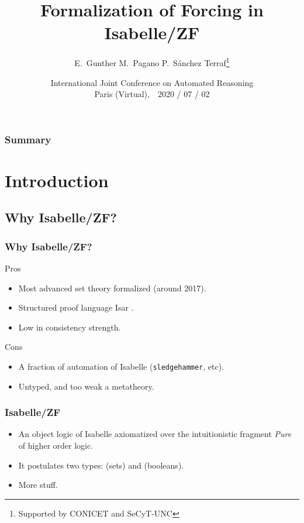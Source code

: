 \documentclass[english]{beamer}
\title[Forcing in Isabelle/ZF]{Formalization of Forcing in Isabelle/ZF}
\author[E.~Gunther, M.~Pagano, PST]{E.~Gunther \qquad M.~Pagano \qquad P.~Sánchez Terraf\thanks{Supported by
    CONICET and SeCyT-UNC} 
}
\institute[UNC]{CIEM-FaMAF --- Universidad Nacional de Córdoba}
\date[IJCAR 2020]{International Joint Conference on Automated
  Reasoning\\ Paris (Virtual),\ \  2020 / 07 / 02}
\begin{document}

\begin{frame}[plain]
  \titlepage
  \begin{center}
    \insertlogo
  \end{center}
\end{frame}
%
\begin{frame}
  \frametitle{Summary}
  \tableofcontents
  \transwipe
\end{frame}
%
\section{Introduction}

\subsection{Why Isabelle/ZF?}

\begin{frame}
  \frametitle{Why Isabelle/ZF?}
  \begin{block}{Pros}
    \begin{itemize}
    \item Most advanced set theory formalized (around 2017).
    \item Structured proof language Isar
      \citep{DBLP:conf/tphol/Wenzel99}.
    \item Low in consistency strength.
    \end{itemize}
  \end{block}
  \pause
  \begin{block}{Cons}
    \begin{itemize}
    \item A fraction of automation of Isabelle (\texttt{sledgehammer},
      etc).
    \item Untyped, and too weak a metatheory.
    \end{itemize}
  \end{block}
\end{frame}

\begin{frame}
  \frametitle{Isabelle/ZF \citep{DBLP:journals/jar/PaulsonG96}}
  \begin{itemize}
  \item<+-> An object logic of Isabelle axiomatized over the
    intuitionistic fragment  \emph{Pure} of higher order logic.
  \item<+-> It postulates \alert<3->{two types}: 
    (sets) and  (booleans). 
    \pause
  \item<+-> More stuff.
  \end{itemize}
\end{frame}
\end{document}
